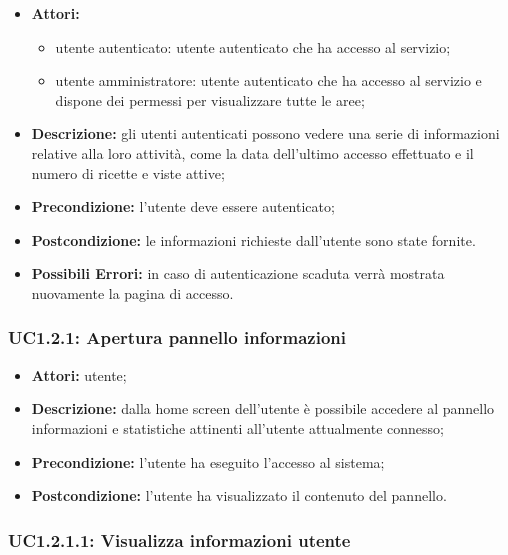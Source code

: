 \begin{itemize}
\item \textbf{Attori:}

\begin{itemize}
    \item utente autenticato: utente autenticato che ha accesso al servizio;
    \item utente amministratore: utente autenticato che ha accesso al servizio e dispone dei permessi per visualizzare tutte le aree;
\end{itemize}

	\item \textbf{Descrizione:} gli utenti autenticati possono vedere una serie di informazioni relative alla 	loro attività, come la data dell'ultimo accesso effettuato e il numero di ricette e viste attive;

	\item \textbf{Precondizione:} l'utente deve essere autenticato;
	
	\item \textbf{Postcondizione:} le informazioni richieste dall'utente sono state fornite.

	\item \textbf{Possibili Errori:} in caso di autenticazione scaduta verrà mostrata nuovamente la pagina di accesso.
\end{itemize}

\subsubsection{UC1.2.1: Apertura pannello informazioni}

\begin{itemize}
    \item \textbf{Attori:} utente;
    \item \textbf{Descrizione:} dalla home screen dell'utente è possibile accedere al pannello informazioni e statistiche attinenti all'utente attualmente connesso;
    \item \textbf{Precondizione:} l'utente ha eseguito l'accesso al sistema;
    \item \textbf{Postcondizione:} l'utente ha visualizzato il contenuto del pannello.
\end{itemize}

\subsubsection{UC1.2.1.1: Visualizza informazioni utente}

